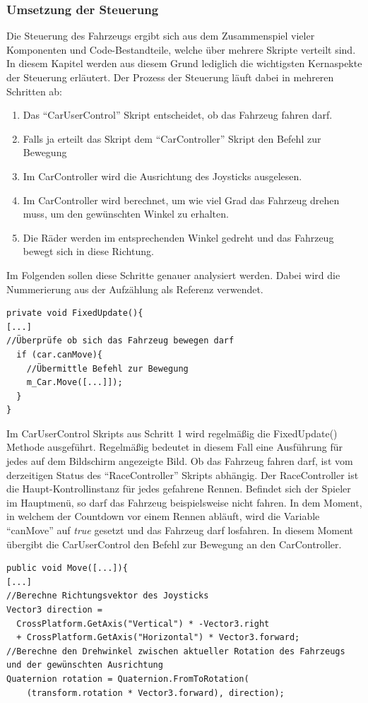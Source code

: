 	\subsubsection{Umsetzung der Steuerung}
	Die Steuerung des Fahrzeugs ergibt sich aus dem Zusammenspiel vieler Komponenten und Code-Bestandteile, welche über mehrere Skripte verteilt sind. In diesem Kapitel werden aus diesem Grund lediglich die wichtigsten Kernaspekte der Steuerung erläutert. Der Prozess der Steuerung läuft dabei in mehreren Schritten ab:
	\begin{enumerate}
		\item{ Das \enquote{CarUserControl} Skript entscheidet, ob das Fahrzeug fahren darf. }
		\item{ Falls ja erteilt das Skript dem \enquote{CarController} Skript den Befehl zur Bewegung }
		\item{ Im CarController wird die Ausrichtung des Joysticks ausgelesen. }
		\item{ Im CarController wird berechnet, um wie viel Grad das Fahrzeug drehen muss, um den gewünschten Winkel zu erhalten. }
		\item{ Die Räder werden im entsprechenden Winkel gedreht und das Fahrzeug bewegt sich in diese Richtung. }
	\end{enumerate}
	Im Folgenden sollen diese Schritte genauer analysiert werden. Dabei wird die Nummerierung aus der Aufzählung als Referenz verwendet.
	\begin{lstlisting}
private void FixedUpdate(){
[...]
//Überprüfe ob sich das Fahrzeug bewegen darf
  if (car.canMove){
    //Übermittle Befehl zur Bewegung
    m_Car.Move([...]]);
  }
}
	\end{lstlisting}
	Im CarUserControl Skripts aus Schritt 1 wird regelmäßig die FixedUpdate() Methode ausgeführt. Regelmäßig bedeutet in diesem Fall eine Ausführung für jedes auf dem Bildschirm angezeigte Bild. Ob das Fahrzeug fahren darf, ist vom derzeitigen Status des \enquote{RaceController} Skripts abhängig. Der RaceController ist die Haupt-Kontrollinstanz für jedes gefahrene Rennen. Befindet sich der Spieler im Hauptmenü, so darf das Fahrzeug beispielsweise nicht fahren. In dem Moment, in welchem der Countdown vor einem Rennen abläuft, wird die Variable \enquote{canMove} auf \emph{true} gesetzt und das Fahrzeug darf losfahren. In diesem Moment übergibt die CarUserControl den Befehl zur Bewegung an den CarController.

	\begin{lstlisting}
public void Move([...]){
[...]
//Berechne Richtungsvektor des Joysticks
Vector3 direction =
  CrossPlatform.GetAxis("Vertical") * -Vector3.right
  + CrossPlatform.GetAxis("Horizontal") * Vector3.forward;
//Berechne den Drehwinkel zwischen aktueller Rotation des Fahrzeugs und der gewünschten Ausrichtung
Quaternion rotation = Quaternion.FromToRotation(
	(transform.rotation * Vector3.forward), direction);
	\end{lstlisting}

